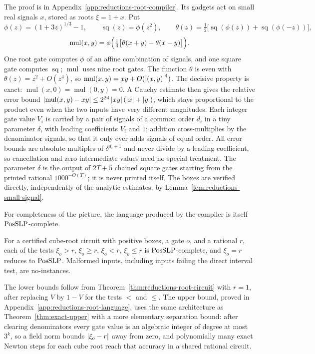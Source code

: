 The proof is in Appendix~\ref{app:reductions-root-compiler}. Its gadgets act
on small real signals $x$, stored as roots $\xi=1+x$. Put
\[
 \phi(z)=(1+3z)^{1/3}-1,\qquad
 \operatorname{sq}(z)=\phi(z^2),\qquad
 \theta(z)=\tfrac12\bigl[\operatorname{sq}(\phi(z))+\operatorname{sq}(\phi(-z))\bigr],
\]
\[
 \operatorname{mul}(x,y)=\phi\Bigl(\tfrac14\bigl[\theta(x+y)-\theta(x-y)\bigr]\Bigr).
\]
One root gate computes $\phi$ of an affine combination of signals, and one
square gate computes $\operatorname{sq}$; $\operatorname{mul}$ uses nine root
gates. The function $\theta$ is even with $\theta(z)=z^2+O(z^4)$, so
$\operatorname{mul}(x,y)=xy+O(\left\lvert(x,y)\right\rvert^4)$. The decisive property is exact:
$\operatorname{mul}(x,0)=\operatorname{mul}(0,y)=0$. A Cauchy estimate then gives
the relative error bound
$\left\lvert\operatorname{mul}(x,y)-xy\right\rvert\le2^{24}\left\lvert xy\right\rvert(\left\lvert x\right\rvert+\left\lvert y\right\rvert)$, which stays
proportional to the product even when the two inputs have very different
magnitudes. Each integer gate value $V_i$ is carried by a pair of signals of a
common order $d_i$ in a tiny parameter $\delta$, with leading coefficients
$V_i$ and $1$; addition cross-multiplies by the denominator signals, so that
it only ever adds signals of equal order. All error bounds are absolute
multiples of $\delta^{d_i+1}$ and never divide by a leading coefficient, so
cancellation and zero intermediate values need no special treatment. The
parameter $\delta$ is the output of $2T+5$ chained square gates starting from
the printed rational $1000^{-O(T)}$; it is never printed itself. The boxes are
verified directly, independently of the analytic estimates, by
Lemma~\ref{lem:reductions-small-signal}.

For completeness of the picture, the language produced by the compiler is
itself $\mathrm{PosSLP}$-complete.

\begin{theorem}
\label{thm:reductions-root-language}
For a certified cube-root circuit with positive boxes, a gate $o$, and a
rational $r$, each of the tests $\xi_o>r$, $\xi_o\ge r$, $\xi_o<r$, $\xi_o\le r$
is $\mathrm{PosSLP}$-complete, and $\xi_o=r$ reduces to $\mathrm{PosSLP}$. Malformed inputs,
including inputs failing the direct interval test, are no-instances.
\end{theorem}

The lower bounds follow from Theorem~\ref{thm:reductions-root-circuit} with
$r=1$, after replacing $V$ by $1-V$ for the tests $<$ and $\le$. The upper
bound, proved in Appendix~\ref{app:reductions-root-language}, uses the same
architecture as Theorem~\ref{thm:exact-upper} with a more elementary separation
bound: after clearing denominators every gate value is an algebraic integer of
degree at most $3^k$, so a field norm bounds $\left\lvert\xi_o-r\right\rvert$ away from zero,
and polynomially many exact Newton steps for each cube root reach that
accuracy in a shared rational circuit.

